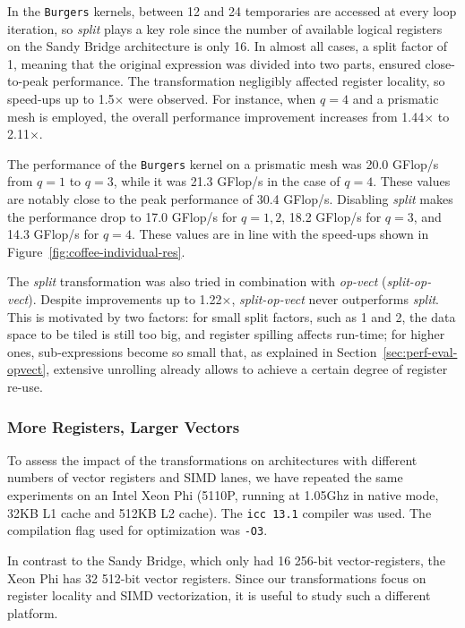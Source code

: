 In the {\tt Burgers} kernels, between 12 and 24 temporaries are accessed at every loop iteration, so \emph{split} plays a key role since the number of available logical registers on the Sandy Bridge architecture is only 16. In almost all cases, a split factor of 1, meaning that the original expression was divided into two parts, ensured close-to-peak performance. The transformation negligibly affected register locality, so speed-ups up to 1.5$\times$ were observed. For instance, when $q=4$ and a prismatic mesh is employed, the overall performance improvement increases from 1.44$\times$ to 2.11$\times$. 

The performance of the {\tt Burgers} kernel on a prismatic mesh was 20.0 GFlop/s from $q=1$ to $q=3$, while it was 21.3 GFlop/s in the case of $q=4$. These values are notably close to the peak performance of 30.4 GFlop/s. Disabling \emph{split} makes the performance drop to 17.0 GFlop/s for $q=1, 2$, 18.2 GFlop/s for $q=3$, and 14.3 GFlop/s for $q=4$. These values are in line with the speed-ups shown in Figure~\ref{fig:coffee-individual-res}.

The \emph{split} transformation was also tried in combination with \emph{op-vect} (\emph{split-op-vect}). Despite improvements up to 1.22$\times$, \emph{split-op-vect} never outperforms \emph{split}. This is motivated by two factors: for small split factors, such as 1 and 2, the data space to be tiled is still too big, and register spilling affects run-time; for higher ones, sub-expressions become so small that, as explained in Section~\ref{sec:perf-eval-opvect}, extensive unrolling already allows to achieve a certain degree of register re-use.

\subsubsection{More Registers, Larger Vectors}
To assess the impact of the transformations on architectures with different numbers of vector registers and SIMD lanes, we have repeated the same experiments on an Intel Xeon Phi (5110P, running at 1.05Ghz in native mode, 32KB L1 cache and 512KB L2 cache). The \texttt{icc 13.1} compiler was used. The compilation flag used for optimization was \texttt{-O3}. 

In contrast to the Sandy Bridge, which only had 16 256-bit vector-registers, the Xeon Phi has 32 512-bit vector registers. Since our transformations focus on register locality and SIMD vectorization, it is useful to study such a different platform. 

